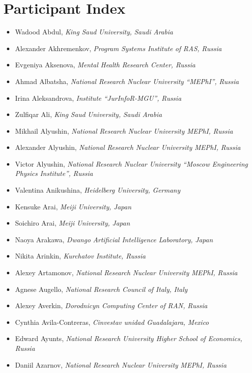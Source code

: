 \documentclass[10pt,fleqn,openany]{book} %
\begin{document}
\chapter{Participant Index}
	\begin{itemize}
		\item Wadood Abdul, \textit{King Saud University, Saudi Arabia}
		\item Alexander Akhremenkov, \textit{Program Systems Institute of RAS, Russia}
		\item Evgeniya Aksenova, \textit{Mental Health Research Center, Russia}
		\item Ahmad Albatsha, \textit{National Research Nuclear University ``MEPhI'', Russia}
		\item Irina Aleksandrova, \textit{Institute ``JurInfoR-MGU'', Russia}
		\item Zulfiqar Ali, \textit{King Saud University, Saudi Arabia}
		\item Mikhail Alyushin, \textit{National Research Nuclear University MEPhI, Russia}
		\item Alexander Alyushin, \textit{National Research Nuclear University MEPhI, Russia}
		\item Victor Alyushin, \textit{National Research Nuclear University ``Moscow Engineering Physics Institute'', Russia}
		\item Valentina Anikushina, \textit{Heidelberg University, Germany}
		\item Kensuke Arai, \textit{Meiji University, Japan}
		\item Soichiro Arai, \textit{Meiji University, Japan}
		\item Naoya Arakawa, \textit{Dwango Artificial Intelligence Laboratory, Japan}
		\item Nikita Arinkin, \textit{Kurchatov Institute, Russia}
		\item Alexey Artamonov, \textit{National Research Nuclear University MEPhI, Russia}
		\item Agnese Augello, \textit{National Research Council of Italy, Italy}
		\item Alexey Averkin, \textit{Dorodnicyn Computing Center of RAN, Russia}
		\item Cynthia Avila-Contreras, \textit{Cinvestav unidad Guadalajara, Mexico}
		\item Edward Ayunts, \textit{National Research University Higher School of Economics, Russia}
		\item Daniil Azarnov, \textit{National Research Nuclear University MEPhI, Russia}

\end{itemize}
\end{document}
